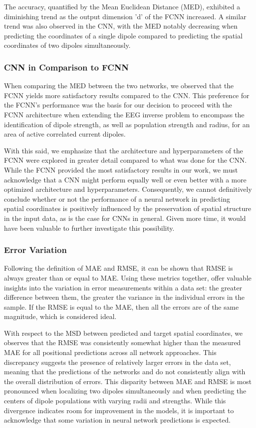 \documentclass[a4paper, UKenglish, 11pt]{uiomaster}
\begin{document}
The accuracy, quantified by the Mean Euclidean Distance (MED), exhibited a diminishing trend as the output dimension 'd' of the FCNN increased. A similar trend was also observed in the CNN, with the MED notably decreasing when predicting the coordinates of a single dipole compared to predicting the spatial coordinates of two dipoles simultaneously.


\subsubsection{CNN in Comparison to FCNN}
When comparing the MED between the two networks, we observed that the FCNN yields more satisfactory results compared to the CNN. This preference for the FCNN's performance was the basis for our decision to proceed with the FCNN architecture when extending the EEG inverse problem to encompass the identification of dipole strength, as well as population strength and radius, for an area of active correlated current dipoles.

With this said, we emphasize that the architecture and hyperparameters of the FCNN were explored in greater detail compared to what was done for the CNN. While the FCNN provided the most satisfactory results in our work, we must acknowledge that a CNN might perform equally well or even better with a more optimized architecture and hyperparameters. Consequently, we cannot definitively conclude whether or not the performance of a neural network in predicting spatial coordinates is positively influenced by the preservation of spatial structure in the input data, as is the case for CNNs in general. Given more time, it would have been valuable to further investigate this possibility.

\subsubsection{Error Variation}
Following the definition of MAE and RMSE, it can be shown that RMSE is always greater than or equal to MAE. Using these metrics together, offer valuable insights into the variation in error measurements within a data set: the greater difference between them, the greater the variance in the individual errors in the sample. If the RMSE is equal to the MAE, then all the errors are of the same magnitude, which is considered ideal.

With respect to the MSD between predicted and target spatial coordinates, we observes that the RMSE was consistently somewhat higher than the measured MAE for all positional predictions across all network approaches. This discrepancy suggests the presence of relatively larger errors in the data set, meaning that the predictions of the networks and do not consistently align with the overall distribution of errors. This disparity between MAE and RMSE is most pronounced when localizing two dipoles simultaneously and when predicting the centers of dipole populations with varying radii and strengths. While this divergence indicates room for improvement in the models, it is important to acknowledge that some variation in neural network predictions is expected.
\end{document}
